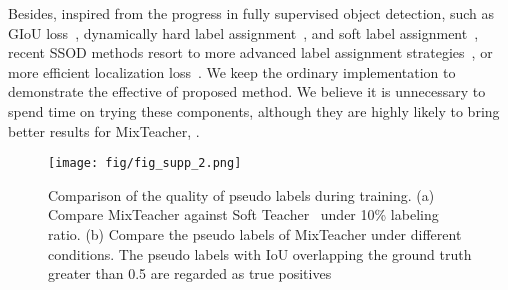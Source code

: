 \documentclass[10pt,twocolumn,letterpaper]{article}
\begin{document}
Besides, inspired from the progress in fully supervised object detection, such as GIoU loss~\cite{giou}, dynamically hard label assignment~\cite{atss, ota}, and soft label assignment~\cite{gfl, freeanchor}, recent SSOD methods resort to more advanced label assignment strategies~\cite{pseco, LabelMatching}, or more efficient localization loss~\cite{polish}. 
We keep the ordinary implementation to demonstrate the effective of proposed method. We believe it is unnecessary to spend time on trying these components, although they are highly likely to bring better results for MixTeacher, .
































\begin{figure}[th]
	\centering
	\texttt{[image: fig/fig\_supp\_2.png]}
    
	\caption{Comparison of the quality of pseudo labels during training. (a) Compare MixTeacher against Soft Teacher~\cite{softTeacher} under 10\% labeling ratio. (b) Compare the pseudo labels of MixTeacher under different conditions. The pseudo labels with IoU overlapping the ground truth greater than 0.5 are regarded as true positives} 
	\label{fig:quality}
\end{figure}
\end{document}
